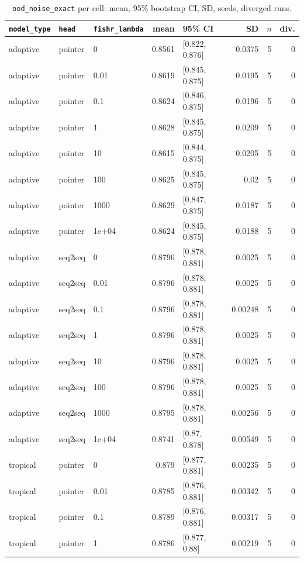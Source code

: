 \documentclass[10pt]{article}
\begin{document}
{\small
\begin{longtable}{lllrlrrr}
\caption{\texttt{ood\_noise\_exact} per cell: mean, 95\% bootstrap CI, SD, seeds, diverged runs.}\label{tab:summary-ood_noise_exact}\\
\toprule
\texttt{model\_type} & \texttt{head} & \texttt{fishr\_lambda} & mean & 95\% CI & SD & $n$ & div.\\
\midrule
\endhead
adaptive & pointer & 0 & 0.8561 & [0.822, 0.876] & 0.0375 & 5 & 0\\
adaptive & pointer & 0.01 & 0.8619 & [0.845, 0.875] & 0.0195 & 5 & 0\\
adaptive & pointer & 0.1 & 0.8624 & [0.846, 0.875] & 0.0196 & 5 & 0\\
adaptive & pointer & 1 & 0.8628 & [0.845, 0.875] & 0.0209 & 5 & 0\\
adaptive & pointer & 10 & 0.8615 & [0.844, 0.875] & 0.0205 & 5 & 0\\
adaptive & pointer & 100 & 0.8625 & [0.845, 0.875] & 0.02 & 5 & 0\\
adaptive & pointer & 1000 & 0.8629 & [0.847, 0.875] & 0.0187 & 5 & 0\\
adaptive & pointer & 1e+04 & 0.8624 & [0.845, 0.875] & 0.0188 & 5 & 0\\
adaptive & seq2seq & 0 & 0.8796 & [0.878, 0.881] & 0.0025 & 5 & 0\\
adaptive & seq2seq & 0.01 & 0.8796 & [0.878, 0.881] & 0.0025 & 5 & 0\\
adaptive & seq2seq & 0.1 & 0.8796 & [0.878, 0.881] & 0.00248 & 5 & 0\\
adaptive & seq2seq & 1 & 0.8796 & [0.878, 0.881] & 0.0025 & 5 & 0\\
adaptive & seq2seq & 10 & 0.8796 & [0.878, 0.881] & 0.0025 & 5 & 0\\
adaptive & seq2seq & 100 & 0.8796 & [0.878, 0.881] & 0.0025 & 5 & 0\\
adaptive & seq2seq & 1000 & 0.8795 & [0.878, 0.881] & 0.00256 & 5 & 0\\
adaptive & seq2seq & 1e+04 & 0.8741 & [0.87, 0.878] & 0.00549 & 5 & 0\\
tropical & pointer & 0 & 0.879 & [0.877, 0.881] & 0.00235 & 5 & 0\\
tropical & pointer & 0.01 & 0.8785 & [0.876, 0.881] & 0.00342 & 5 & 0\\
tropical & pointer & 0.1 & 0.8789 & [0.876, 0.881] & 0.00317 & 5 & 0\\
tropical & pointer & 1 & 0.8786 & [0.877, 0.88] & 0.00219 & 5 & 0\\

\end{longtable}}
\end{document}
